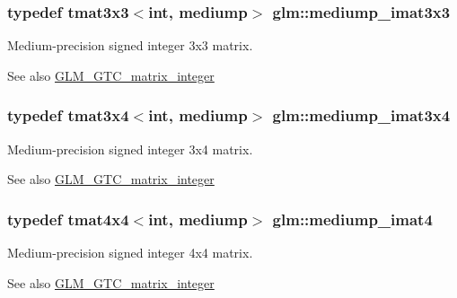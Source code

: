 \subsubsection[{mediump\+\_\+imat3x3}]{\setlength{\rightskip}{0pt plus 5cm}typedef tmat3x3$<$int, mediump$>$ {\bf glm\+::mediump\+\_\+imat3x3}}\label{group__gtc__matrix__integer_gab4c647321a342c58119144ad08c6c406}
Medium-\/precision signed integer 3x3 matrix. \begin{DoxySeeAlso}{See also}
\hyperlink{group__gtc__matrix__integer}{G\+L\+M\+\_\+\+G\+T\+C\+\_\+matrix\+\_\+integer} 
\end{DoxySeeAlso}
\hypertarget{group__gtc__matrix__integer_ga721a754fc35cc5ac097e331d893a6b2c}{}
\subsubsection[{mediump\+\_\+imat3x4}]{\setlength{\rightskip}{0pt plus 5cm}typedef tmat3x4$<$int, mediump$>$ {\bf glm\+::mediump\+\_\+imat3x4}}\label{group__gtc__matrix__integer_ga721a754fc35cc5ac097e331d893a6b2c}
Medium-\/precision signed integer 3x4 matrix. \begin{DoxySeeAlso}{See also}
\hyperlink{group__gtc__matrix__integer}{G\+L\+M\+\_\+\+G\+T\+C\+\_\+matrix\+\_\+integer} 
\end{DoxySeeAlso}
\hypertarget{group__gtc__matrix__integer_ga680c97868de08658ca4924718d951def}{}
\subsubsection[{mediump\+\_\+imat4}]{\setlength{\rightskip}{0pt plus 5cm}typedef tmat4x4$<$int, mediump$>$ {\bf glm\+::mediump\+\_\+imat4}}\label{group__gtc__matrix__integer_ga680c97868de08658ca4924718d951def}
Medium-\/precision signed integer 4x4 matrix. \begin{DoxySeeAlso}{See also}
\hyperlink{group__gtc__matrix__integer}{G\+L\+M\+\_\+\+G\+T\+C\+\_\+matrix\+\_\+integer} 
\end{DoxySeeAlso}
\hypertarget{group__gtc__matrix__integer_gabfe107153637dfd7a0c272ff1ba892ed}{}

